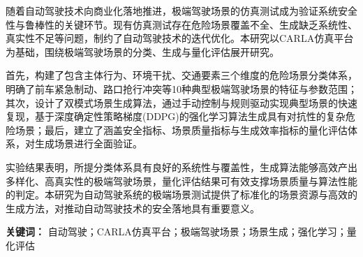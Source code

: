 随着自动驾驶技术向商业化落地推进，极端驾驶场景的仿真测试成为验证系统安全性与鲁棒性的关键环节。现有仿真测试存在危险场景覆盖不全、生成缺乏系统性、真实性不足等问题，制约了自动驾驶技术的迭代优化。本研究以CARLA仿真平台为基础，围绕极端驾驶场景的分类、生成与量化评估展开研究。

首先，构建了包含主体行为、环境干扰、交通要素三个维度的危险场景分类体系，明确了前车紧急制动、路口抢行冲突等10种典型极端驾驶场景的特征与参数范围；其次，设计了双模式场景生成算法，通过手动控制与规则驱动实现典型场景的快速复现，基于深度确定性策略梯度(DDPG)的强化学习算法生成具有对抗性的复杂危险场景；最后，建立了涵盖安全指标、场景质量指标与生成效率指标的量化评估体系，对生成场景进行全面验证。

实验结果表明，所提分类体系具有良好的系统性与覆盖性，生成算法能够高效产出多样化、高真实性的极端驾驶场景，量化评估结果可有效支撑场景质量与算法性能的判定。本研究为自动驾驶系统的极端场景测试提供了标准化的场景资源与高效的生成方法，对推动自动驾驶技术的安全落地具有重要意义。

\textbf{关键词：} 自动驾驶；CARLA仿真平台；极端驾驶场景；场景生成；强化学习；量化评估